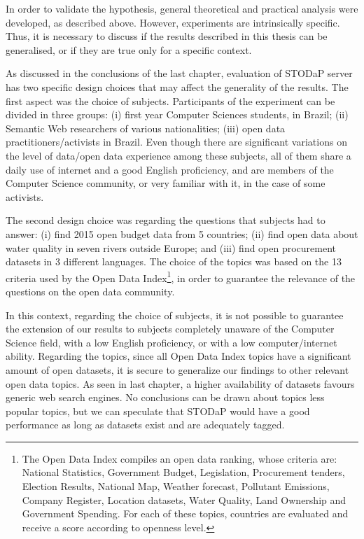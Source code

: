 In order to validate the hypothesis, general theoretical and practical analysis were developed, as described above.
However, experiments are intrinsically specific.
Thus, it is necessary to discuss if the results described in this thesis can be generalised, or if they are true only for a specific context.

As discussed in the conclusions of the last chapter, evaluation of STODaP server has two specific design choices that may affect the generality of the results.
The first aspect was the choice of subjects.
Participants of the experiment can be divided in three groups: (i) first year Computer Sciences students, in Brazil; (ii) Semantic Web researchers of various nationalities; (iii) open data practitioners/activists in Brazil.
Even though there are significant variations on the level of data/open data experience among these subjects, all of them share a daily use of internet and a good English proficiency, and are members of the Computer Science community, or very familiar with it, in the case of some activists.

The second design choice was regarding the questions that subjects had to answer: (i) find 2015 open budget data from 5 countries; (ii) find open data about water quality in seven rivers outside Europe; and (iii) find open procurement datasets in 3 different languages.
The choice of the topics was based on the 13 criteria used by the Open Data Index\footnote{The Open Data Index compiles an open data ranking, whose criteria are: National Statistics, Government Budget, Legislation, Procurement tenders, Election Results, National Map, Weather forecast, Pollutant Emissions, Company Register, Location datasets, Water Quality, Land Ownership and Government Spending. For each of these topics, countries are evaluated and receive a score according to openness level.}, in order to guarantee the relevance of the questions on the open data community.

In this context, regarding the choice of subjects, it is not possible to guarantee the extension of our results to subjects completely unaware of the Computer Science field, with a low English proficiency, or with a low computer/internet ability.
Regarding the topics, since all Open Data Index topics have a significant amount of open datasets, it is secure to generalize our findings to other relevant open data topics.
As seen in last chapter, a higher availability of datasets favours generic web search engines.
No conclusions can be drawn about topics less popular topics, but we can speculate that STODaP would have a good performance as long as datasets exist and are adequately tagged.

